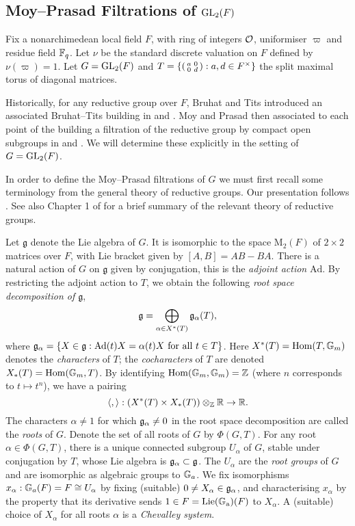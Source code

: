 \subsection{Moy--Prasad Filtrations of \texorpdfstring{$\mathrm{GL}_2(F)$}{TEXT}}

Fix a nonarchimedean local field $F$, with ring of integers $\mathcal{O}$, uniformiser $\varpi$ and residue field $\mathbb{F}_q$. Let $\nu$ be the standard discrete valuation on $F$ defined by $\nu(\varpi)=1$. Let $G=\mathrm{GL}_2(F)$ and $T=\left\{\begin{psmallmatrix}
    a&0\\0&d
\end{psmallmatrix} : a,d \in F^\times\right\}$ the split maximal torus of diagonal matrices.

Historically, for any reductive group over $F$, Bruhat and Tits introduced an associated Bruhat--Tits building in \cite{BT1} and \cite{BT2}. Moy and Prasad then associated to each point of the building a filtration of the reductive group by compact open subgroups in \cite{MP1} and \cite{MP2}. We will determine these explicitly in the setting of $G=\mathrm{GL}_2(F)$.

In order to define the Moy--Prasad filtrations of $G$ we must first recall some terminology from the general theory of reductive groups. Our presentation follows \cite{Fin1}. See also Chapter 1 of \cite{GH1} for a brief summary of the relevant theory of reductive groups.

Let $\mathfrak g$ denote the Lie algebra of $G$. It is isomorphic to the space $\mathrm{M}_2(F)$ of $2\times 2$ matrices over $F$, with Lie bracket given by $[A,B]=AB-BA$. There is a natural action of $G$ on $\mathfrak g$ given by conjugation, this is the \textit{adjoint action} $\mathrm{Ad}$. By restricting the adjoint action to $T$, we obtain the following \textit{root space decomposition of $\mathfrak g$},
$$\mathfrak{g} = \bigoplus\limits_{\alpha \in X^*(T)} \mathfrak{g}_\alpha(T),$$
where $\mathfrak{g}_\alpha = \{X \in \mathfrak{g} : \mathrm{Ad}(t)X = \alpha(t)X \text{ for all } t \in T\}$. Here $X^*(T) = \mathrm{Hom}(T,\mathbb{G}_m)$ denotes the \textit{characters} of $T$; the \textit{cocharacters} of $T$ are denoted $X_*(T) = \mathrm{Hom}(\mathbb{G}_m,T)$. By identifying $\mathrm{Hom}(\mathbb{G}_m, \mathbb{G}_m) = \mathbb{Z}$ (where $n$ corresponds to $t \mapsto t^n$), we have a pairing
$$\langle, \rangle : \left(X^*(T) \times X_*(T)\right) \otimes_{\mathbb{Z}} \mathbb{R} \to \mathbb{R}.$$ The characters $\alpha \neq 1$ for which $\mathfrak{g}_\alpha \neq 0$ in the root space decomposition are called the \textit{roots} of $G$. Denote the set of all roots of $G$ by $\Phi(G,T)$. For any root $\alpha \in \Phi(G,T)$, there is a unique connected subgroup $U_\alpha$ of $G$, stable under conjugation by $T$, whose Lie algebra is $\mathfrak{g}_\alpha \subset \mathfrak{g}$. The $U_\alpha$ are the \textit{root groups} of $G$ and are isomorphic as algebraic groups to $\mathbb{G}_a$. We fix isomorphisms $x_\alpha: \mathbb{G}_a(F)=F \cong U_\alpha$ by fixing (suitable) $0 \neq X_\alpha \in \mathfrak{g}_\alpha$, and characterising $x_\alpha$ by the property that its derivative sends $1 \in F=\mathrm{Lie(\mathbb{G}_a)}(F)$ to $X_\alpha$. A (suitable) choice of $X_\alpha$ for all roots $\alpha$ is a \textit{Chevalley system}. 

